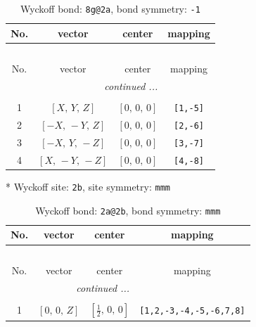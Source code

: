 \documentclass[fleqn,8pt]{jsarticle}
\begin{document}
\begin{longtable}{cccc}
\caption{Wyckoff bond: {\tt 8g@2a}, bond symmetry: {\tt -1}}
 \\
 \hline \hline
No. & vector & center & mapping \\ \hline \endfirsthead

\multicolumn{3}{l}{\tablename\ \thetable{}} \\
 \hline \hline
No. & vector & center & mapping \\ \hline \endhead

 \hline \hline
\multicolumn{3}{r}{\footnotesize\it continued ...} \\ \endfoot

 \hline \hline
\multicolumn{3}{r}{} \\ \endlastfoot

1 & $\left[ X,\, Y,\, Z \right]$ & $\left[ 0,\, 0,\, 0 \right]$ & {\tt [1,-5]} \\ \hline
2 & $\left[ - X,\, - Y,\, Z \right]$ & $\left[ 0,\, 0,\, 0 \right]$ & {\tt [2,-6]} \\ \hline
3 & $\left[ - X,\, Y,\, - Z \right]$ & $\left[ 0,\, 0,\, 0 \right]$ & {\tt [3,-7]} \\ \hline
4 & $\left[ X,\, - Y,\, - Z \right]$ & $\left[ 0,\, 0,\, 0 \right]$ & {\tt [4,-8]} \\
\end{longtable}
* Wyckoff site: {\tt 2b}, site symmetry: {\tt mmm}
\renewcommand{\arraystretch}{1.2}
\begin{longtable}{cccc}
\caption{Wyckoff bond: {\tt 2a@2b}, bond symmetry: {\tt mmm}}
 \\
 \hline \hline
No. & vector & center & mapping \\ \hline \endfirsthead

\multicolumn{3}{l}{\tablename\ \thetable{}} \\
 \hline \hline
No. & vector & center & mapping \\ \hline \endhead

 \hline \hline
\multicolumn{3}{r}{\footnotesize\it continued ...} \\ \endfoot

 \hline \hline
\multicolumn{3}{r}{} \\ \endlastfoot

1 & $\left[ 0,\, 0,\, Z \right]$ & $\left[ \frac{1}{2},\, 0,\, 0 \right]$ & {\tt [1,2,-3,-4,-5,-6,7,8]} \\
\end{longtable}
\renewcommand{\arraystretch}{1.2}
\end{document}

